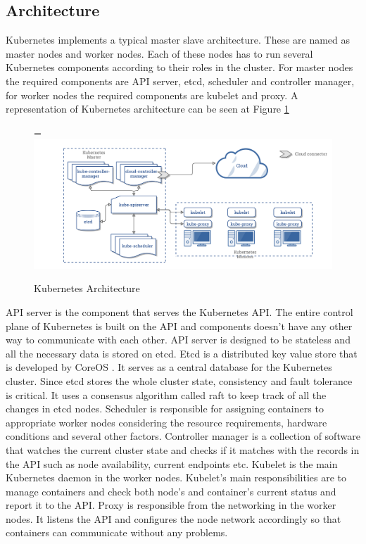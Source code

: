 \documentclass[12pt,oneandhalf,chaparabic,ceng,ms,eng,oneside,pntc]{gsufbe}
\makeatletter
\let\old@includegraphics\includegraphics
\renewcommand{\includegraphics}[2][,]{%
  \setbox9=\hbox{\old@includegraphics[#1]{#2}}%
  \ifdim\wd9>\textwidth
    \old@includegraphics[#1,width=\textwidth]{#2}%
  \else
    \old@includegraphics[#1]{#2}%
  \fi%
}
\makeatother
\begin{document}
\subsection{Architecture}
Kubernetes implements a typical master slave architecture.  These are named as master nodes and worker
nodes.  Each of these nodes has to run several Kubernetes components according to their roles in the
cluster.  For master nodes the required components are API server, etcd, scheduler and
controller manager, for worker nodes the required components are kubelet and proxy.  A representation
of Kubernetes architecture can be seen at Figure \ref{fig:k8sarch}

\begin{figure}
\centering
\includegraphics[]{k8s-arch.png}
\caption{Kubernetes Architecture \cite{kube_arch}}
\label{fig:k8sarch}
\end{figure}

API server is the component that serves the Kubernetes API.  The entire control plane of Kubernetes is
built on the API and components doesn't have any other way to communicate with each other.  API server
is designed to be stateless and all the necessary data is stored on etcd.
Etcd is a distributed key value store that is developed by CoreOS \cite{coreos}.  It serves as a central database for
the Kubernetes cluster.  Since etcd stores the whole cluster state, consistency and fault tolerance is
critical.  It uses a consensus algorithm called raft \cite{raft} to keep track of all the changes in etcd nodes.
Scheduler is responsible for assigning containers to appropriate worker nodes considering the resource
requirements, hardware conditions and several other factors.
Controller manager is a collection of software that watches the current cluster state and checks if it
matches with the records in the API such as node availability, current endpoints etc.
Kubelet is the main Kubernetes daemon in the worker nodes.  Kubelet's main responsibilities are to 
manage containers and check both node's and container's current status and report it to the API.
Proxy is responsible from the networking in the worker nodes.  It listens the API and configures the
node network accordingly so that containers can communicate without any problems.
\end{document}
